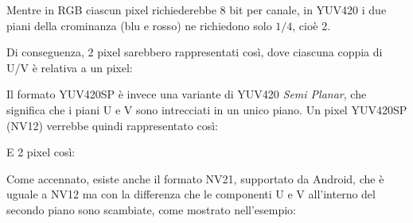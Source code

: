 
\begin{figure}[H]
\end{figure}

Mentre in RGB ciascun pixel richiederebbe 8 bit per canale, in YUV420 i due piani della crominanza (blu e rosso) ne richiedono solo $1/4$, cioè 2.

Di conseguenza, 2 pixel sarebbero rappresentati così, dove ciascuna coppia di U/V è relativa a un pixel:

\begin{figure}[H]
\end{figure}

Il formato YUV420SP è invece una variante di YUV420 \emph{Semi Planar}, che significa che i piani U e V sono intrecciati in un unico piano. Un pixel YUV420SP (NV12) verrebbe quindi rappresentato così:

\begin{figure}[H]
\end{figure}

E 2 pixel così:

\begin{figure}[H]
\end{figure}

Come accennato, esiste anche il formato NV21, supportato da Android, che è uguale a NV12 ma con la differenza che le componenti U e V all'interno del secondo piano sono scambiate, come mostrato nell'esempio:

